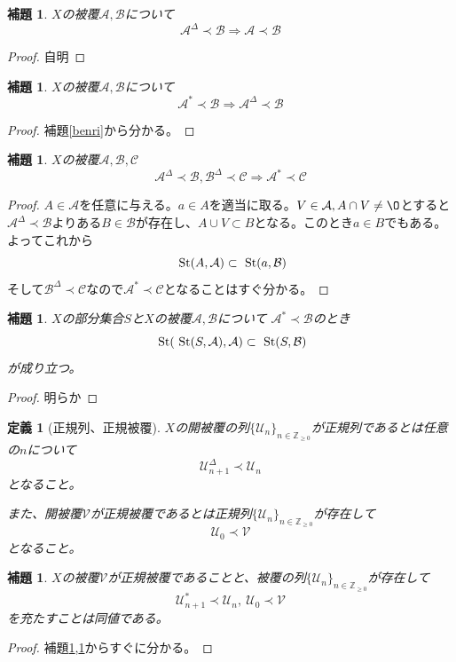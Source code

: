 \documentclass[leqno]{jsarticle}
\newtheorem{lem}[thm]{補題}
\newtheorem{df}[thm]{定義}
\newcommand{\To}{\Longrightarrow}
\newcommand{\zz}{\mathbb{Z}}
\newcommand{\s}{\text{  {\rm St}} }
\newcommand{\uu}{\mathcal{U}}
\newcommand{\A}{\mathcal{A}}
\newcommand{\B}{\mathcal{B}}
\newcommand{\C}{\mathcal{C}}
\newcommand{\dd}{\Delta}
\newcommand{\pr}{\prec}
\newcommand{\zr}{\zz_{\ge0}}
\begin{document}
\begin{lem}\label{aaa}$X$の被覆$\A,\B$について
\[
\A^{\dd}\pr \B\To \A\pr\B
\]
\end{lem}
\begin{proof}
自明
\end{proof}




\begin{lem}\label{aaa}$X$の被覆$\A,\B$について
\[
\A^{*}\pr \B\To \A^{\dd}\pr\B
\]
\end{lem}
\begin{proof}
補題\ref{benri}から分かる。
\end{proof}

\begin{lem}\label{bebe}$X$の被覆$\A,\B,\C$
\[
\A^{\dd}\pr\B,\B^{\dd}\pr\C\To \A^{*}\pr\C
\]
\end{lem}
\begin{proof}
$A\in \A$を任意に与える。$a\in A$を適当に取る。$V\in \A,A\cap V\neq\O$とすると$\A^{\dd}\pr\B$よりある$B\in\B$が存在し、$A\cup V\subset B$となる。このとき$a\in B$でもある。よってこれから
\[
\s(A,\A)\subset \s(a,\B)
\]
そして$\B^{\dd}\pr \C$なので$\A^{*}\pr \C$となることはすぐ分かる。
\end{proof}

\begin{lem}
$X$の部分集合$S$と$X$の被覆$\A,\B$について
$\A^{*}\pr \B$のとき
\[
\s(\s(S,\A),\A)\subset  \s(S,\B)
\]
が成り立つ。
\end{lem}
\begin{proof}
明らか
\end{proof}


\begin{df}[正規列、正規被覆]
$X$の開被覆の列$\{\uu_n\}_{n\in \zr}$が正規列であるとは任意の$n$について
\[
\uu_{n+1}^{\dd}\pr \uu_n
\]
となること。\par
また、開被覆$\mathcal{V}$が正規被覆であるとは正規列$\{\uu_n\}_{n\in \zr}$が存在して
\[
\uu_0\pr\mathcal{V}
\]
となること。
\end{df}


\setcounter{equation}{0}
\begin{lem}\label{ccc}
$X$の被覆$\mathcal{V}$が正規被覆であることと、被覆の列$\{\uu_n\}_{n\in \zr}$が存在して
\[
\uu^{*}_{n+1}\pr\uu_n,\ \uu_0\pr\mathcal{V}
\]
を充たすことは同値である。

\end{lem}
\begin{proof}
補題\ref{aaa},\ref{bebe}からすぐに分かる。
\end{proof}
\end{document}
